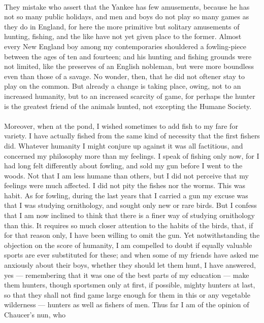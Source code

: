 \documentclass[letterpaper,12pt]{article}
\begin{document}
\paragraph{} They mistake who assert that the Yankee has few amusements, because
he has not so many public holidays, and men and boys do not play so many games
as they do in England, for here the more primitive but solitary amusements of
hunting, fishing, and the like have not yet given place to the former. Almost
every New England boy among my contemporaries shouldered a fowling-piece between
the ages of ten and fourteen; and his hunting and fishing grounds were not
limited, like the preserves of an English nobleman, but were more boundless even
than those of a savage. No wonder, then, that he did not oftener stay to play on
the common.  But already a change is taking place, owing, not to an increased
humanity, but to an increased scarcity of game, for perhaps the hunter is the
greatest friend of the animals hunted, not excepting the Humane Society.

\paragraph{} Moreover, when at the pond, I wished sometimes to add fish to my
fare for variety. I have actually fished from the same kind of necessity that
the first fishers did. Whatever humanity I might conjure up against it was all
factitious, and concerned my philosophy more than my feelings. I speak of
fishing only now, for I had long felt differently about fowling, and sold my gun
before I went to the woods. Not that I am less humane than others, but I did not
perceive that my feelings were much affected. I did not pity the fishes nor the
worms. This was habit. As for fowling, during the last years that I carried a
gun my excuse was that I was studying ornithology, and sought only new or rare
birds. But I confess that I am now inclined to think that there is a finer way
of studying ornithology than this. It requires so much closer attention to the
habits of the birds, that, if for that reason only, I have been willing to omit
the gun. Yet notwithstanding the objection on the score of humanity, I am
compelled to doubt if equally valuable sports are ever substituted for these;
and when some of my friends have asked me anxiously about their boys, whether
they should let them hunt, I have answered, yes --- remembering that it was one
of the best parts of my education --- make them hunters, though sportsmen only
at first, if possible, mighty hunters at last, so that they shall not find game
large enough for them in this or any vegetable wilderness --- hunters as well as
fishers of men. Thus far I am of the opinion of Chaucer's nun, who
\end{document}
